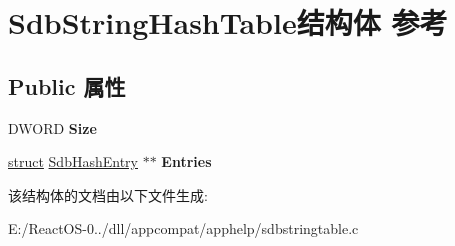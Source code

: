 \hypertarget{struct_sdb_string_hash_table}{}\section{Sdb\+String\+Hash\+Table结构体 参考}
\label{struct_sdb_string_hash_table}
\subsection*{Public 属性}
\begin{DoxyCompactItemize}
\item 
\mbox{\label{struct_sdb_string_hash_table_a35242e93105bbe59375de6e3d5be0537}} 
D\+W\+O\+RD {\bfseries Size}
\item 
\mbox{\label{struct_sdb_string_hash_table_a12535e1178fe48ec285dd8bed93b6f18}} 
\hyperlink{interfacestruct}{struct} \hyperlink{struct_sdb_hash_entry}{Sdb\+Hash\+Entry} $\ast$$\ast$ {\bfseries Entries}
\end{DoxyCompactItemize}


该结构体的文档由以下文件生成\+:\begin{DoxyCompactItemize}
\item 
E\+:/\+React\+O\+S-\/0../dll/appcompat/apphelp/sdbstringtable.\+c\end{DoxyCompactItemize}

